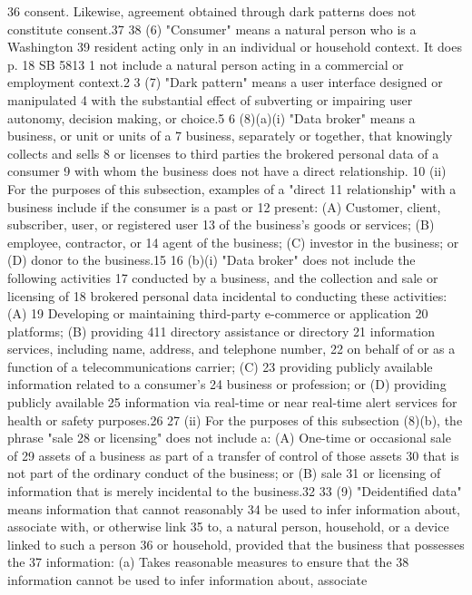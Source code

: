 36 consent. Likewise, agreement obtained through dark patterns does not
constitute consent.37
38 (6) "Consumer" means a natural person who is a Washington
39 resident acting only in an individual or household context. It does
p. 18 SB 5813
1 not include a natural person acting in a commercial or employment
context.2
3 (7) "Dark pattern" means a user interface designed or manipulated
4 with the substantial effect of subverting or impairing user autonomy,
decision making, or choice.5
6 (8)(a)(i) "Data broker" means a business, or unit or units of a
7 business, separately or together, that knowingly collects and sells
8 or licenses to third parties the brokered personal data of a consumer
9 with whom the business does not have a direct relationship.
10 (ii) For the purposes of this subsection, examples of a "direct
11 relationship" with a business include if the consumer is a past or
12 present: (A) Customer, client, subscriber, user, or registered user
13 of the business's goods or services; (B) employee, contractor, or
14 agent of the business; (C) investor in the business; or (D) donor to
the business.15
16 (b)(i) "Data broker" does not include the following activities
17 conducted by a business, and the collection and sale or licensing of
18 brokered personal data incidental to conducting these activities: (A)
19 Developing or maintaining third-party e-commerce or application
20 platforms; (B) providing 411 directory assistance or directory
21 information services, including name, address, and telephone number,
22 on behalf of or as a function of a telecommunications carrier; (C)
23 providing publicly available information related to a consumer's
24 business or profession; or (D) providing publicly available
25 information via real-time or near real-time alert services for health
or safety purposes.26
27 (ii) For the purposes of this subsection (8)(b), the phrase "sale
28 or licensing" does not include a: (A) One-time or occasional sale of
29 assets of a business as part of a transfer of control of those assets
30 that is not part of the ordinary conduct of the business; or (B) sale
31 or licensing of information that is merely incidental to the
business.32
33 (9) "Deidentified data" means information that cannot reasonably
34 be used to infer information about, associate with, or otherwise link
35 to, a natural person, household, or a device linked to such a person
36 or household, provided that the business that possesses the
37 information: (a) Takes reasonable measures to ensure that the
38 information cannot be used to infer information about, associate
